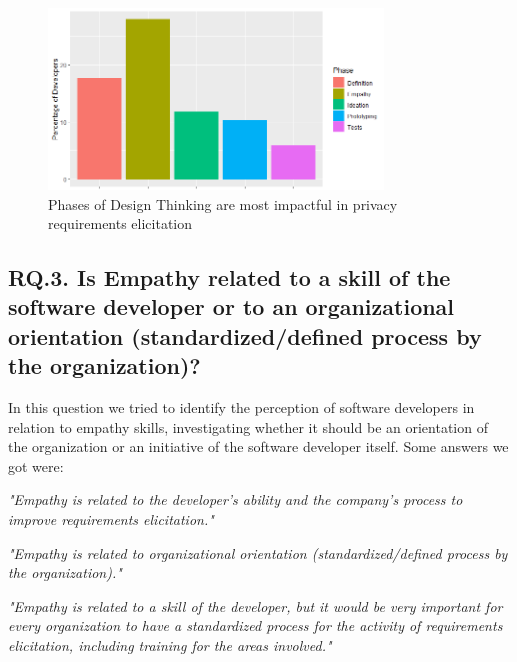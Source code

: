 \documentclass[conference]{IEEEtran}
\begin{document}
\begin{figure}
    \centering
    \includegraphics[width=3.5in]{Figures/RQ15.png}
    \caption{Phases of Design Thinking are most impactful in privacy requirements elicitation}
    \label{fig:impactos}
\end{figure}

\subsection{RQ.3. Is Empathy related to a skill of the software developer or to an organizational orientation (standardized/defined process by the organization)?}


In this question we tried to identify the perception of software developers in relation to empathy skills, investigating whether it should be an orientation of the organization or an initiative of the software developer itself. Some answers we got were:

\begin{mq}
\emph{"Empathy is related to the developer's ability and the company's process to improve requirements elicitation."}
\end{mq}

\begin{mq}
\emph{"Empathy is related to organizational orientation (standardized/defined process by the organization)."}
\end{mq}

\begin{mq}
\emph{"Empathy is related to a skill of the developer, but it would be very important for every organization to have a standardized process for the activity of requirements elicitation, including training for the areas involved."}
\end{mq}
\end{document}
